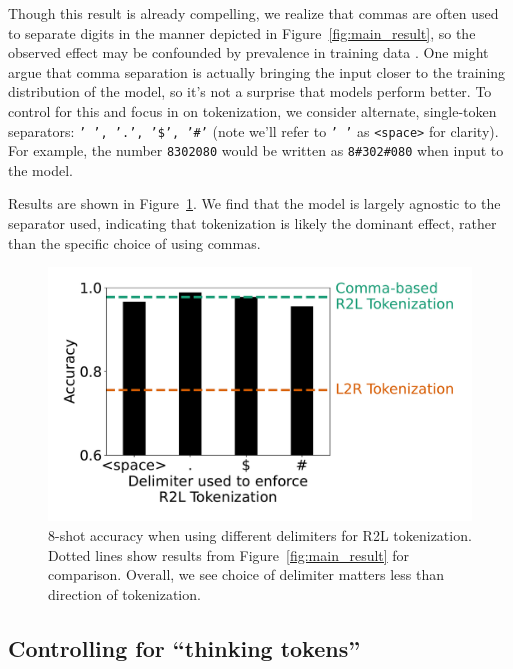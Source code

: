 \documentclass{article}
\theoremstyle{plain}
\theoremstyle{definition}
\theoremstyle{remark}
\begin{document}
Though this result is already compelling, we realize that commas are often used to separate digits in the manner depicted in Figure~\ref{fig:main_result}, so the observed effect may be confounded by prevalence in training data \cite{mccoy2023embers}. One might argue that comma separation is actually bringing the input closer to the training distribution of the model, so it's not a surprise that models perform better. To control for this and focus in on tokenization, we consider alternate, single-token separators: \texttt{' ', '.', '\$', '\#'} (note we'll refer to \texttt{' '} as \texttt{<space>} for clarity). For example, the number \texttt{8302080} would be written as \texttt{8\#302\#080} when input to the model.

Results are shown in Figure~\ref{fig:control_delim}. We find that the model is largely agnostic to the separator used, indicating that tokenization is likely the dominant effect, rather than the specific choice of using commas.

\begin{figure}[ht]
    \centering
    \vspace{-1em}
    \includegraphics[width=\columnwidth]{figures/control_delimiter.pdf}
    \vspace{-3em}
    \caption{8-shot accuracy when using different delimiters for R2L tokenization. Dotted lines show results from Figure~\ref{fig:main_result} for comparison. Overall, we see choice of delimiter matters less than direction of tokenization.}
    \vspace{-1em}
    \label{fig:control_delim}
\end{figure}

\subsection{Controlling for ``thinking tokens''}
\label{sec:thinking_tokens}
\end{document}
